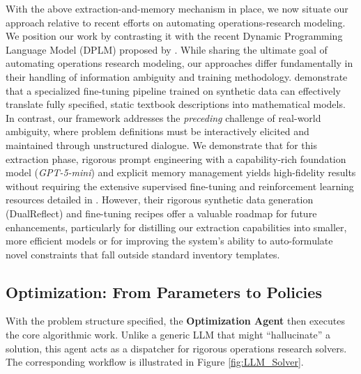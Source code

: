 \documentclass[mnsc,nonblindrev]{informs3_hide}
\begin{document}
\begin{remark}
    With the above extraction-and-memory mechanism in place, we now situate our approach relative to recent efforts on automating operations-research modeling.
    We position our work by contrasting it with the recent Dynamic Programming Language Model (DPLM) proposed by \citet{zhou2025auto}. While sharing the ultimate goal of automating operations research modeling, our approaches differ fundamentally in their handling of information ambiguity and training methodology. \citet{zhou2025auto} demonstrate that a specialized fine-tuning pipeline trained on synthetic data can effectively translate fully specified, static textbook descriptions into mathematical models. In contrast, our framework addresses the \emph{preceding} challenge of real-world ambiguity, where problem definitions must be interactively elicited and maintained through unstructured dialogue. We demonstrate that for this extraction phase, rigorous prompt engineering with a capability-rich foundation model (\emph{GPT-5-mini}) and explicit memory management yields high-fidelity results without requiring the extensive supervised fine-tuning and reinforcement learning resources detailed in \citet{zhou2025auto}. However, their rigorous synthetic data generation (DualReflect) and fine-tuning recipes offer a valuable roadmap for future enhancements, particularly for distilling our extraction capabilities into smaller, more efficient models or for improving the system's ability to auto-formulate novel constraints that fall outside standard inventory templates.
\end{remark}
    
    

    
    

    \subsection{Optimization: From Parameters to Policies}



    With the problem structure specified, the \textbf{Optimization Agent} then executes the core algorithmic work. Unlike a generic LLM that might ``hallucinate'' a solution, this agent acts as a dispatcher for rigorous operations research solvers. The corresponding workflow is illustrated in Figure \ref{fig:LLM_Solver}.

    
\end{document}
